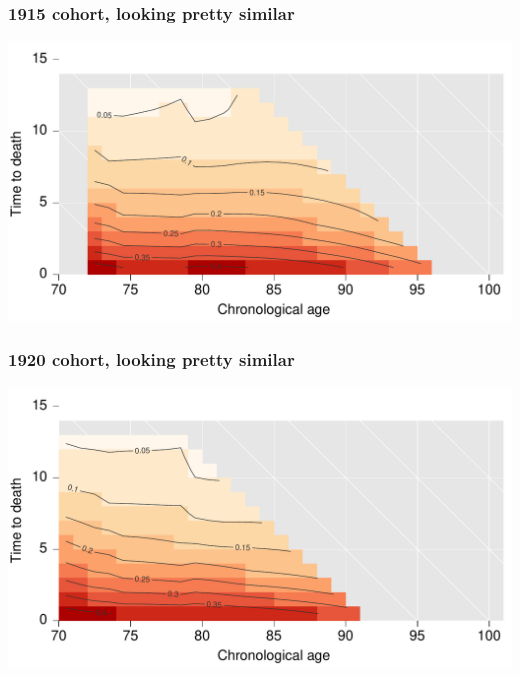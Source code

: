 \documentclass[20pt]{beamer}
\begin{document}

\begin{frame}
\frametitle{1915 cohort, looking pretty similar}
\vspace{-4em}
\begin{center}
\includegraphics[scale=1]{Figures/srhpoor1915.pdf}
\end{center}
\end{frame}


\begin{frame}
\frametitle{1920 cohort, looking pretty similar}
\vspace{-4em}
\begin{center}
\includegraphics[scale=1]{Figures/srhpoor1920.pdf}
\end{center}
\end{frame}

\end{document}
